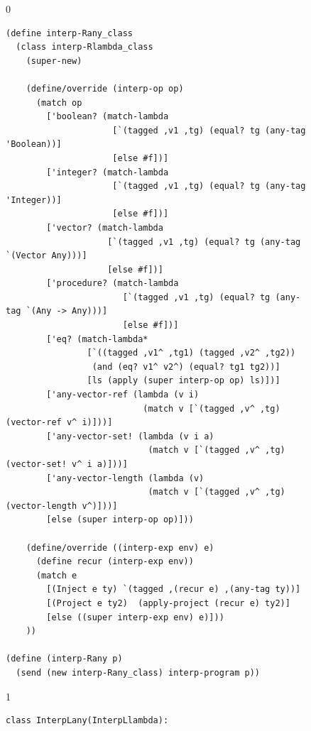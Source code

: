 \documentclass[7x10,nocrop]{TimesAPriori_MIT}%
\def\racketEd{0}
\def\pythonEd{1}
\def\edition{0}
\begin{document}
\begin{figure}[btp]
{\if\edition\racketEd
\begin{lstlisting}
(define interp-Rany_class
  (class interp-Rlambda_class
    (super-new)

    (define/override (interp-op op)
      (match op
        ['boolean? (match-lambda
                     [`(tagged ,v1 ,tg) (equal? tg (any-tag 'Boolean))]
                     [else #f])]
        ['integer? (match-lambda
                     [`(tagged ,v1 ,tg) (equal? tg (any-tag 'Integer))]
                     [else #f])]
        ['vector? (match-lambda
                    [`(tagged ,v1 ,tg) (equal? tg (any-tag `(Vector Any)))]
                    [else #f])]
        ['procedure? (match-lambda
                       [`(tagged ,v1 ,tg) (equal? tg (any-tag `(Any -> Any)))]
                       [else #f])]
        ['eq? (match-lambda*
                [`((tagged ,v1^ ,tg1) (tagged ,v2^ ,tg2))
                 (and (eq? v1^ v2^) (equal? tg1 tg2))]
                [ls (apply (super interp-op op) ls)])]
        ['any-vector-ref (lambda (v i)
                           (match v [`(tagged ,v^ ,tg) (vector-ref v^ i)]))]
        ['any-vector-set! (lambda (v i a)
                            (match v [`(tagged ,v^ ,tg) (vector-set! v^ i a)]))]
        ['any-vector-length (lambda (v)
                            (match v [`(tagged ,v^ ,tg) (vector-length v^)]))]
        [else (super interp-op op)]))

    (define/override ((interp-exp env) e)
      (define recur (interp-exp env))
      (match e
        [(Inject e ty) `(tagged ,(recur e) ,(any-tag ty))]
        [(Project e ty2)  (apply-project (recur e) ty2)]
        [else ((super interp-exp env) e)]))
    ))

(define (interp-Rany p)
  (send (new interp-Rany_class) interp-program p))
\end{lstlisting}
\fi}
{\if\edition\pythonEd
\begin{lstlisting}[basicstyle=\ttfamily\footnotesize]
class InterpLany(InterpLlambda):


\end{lstlisting}}
\end{figure}
\end{document}
